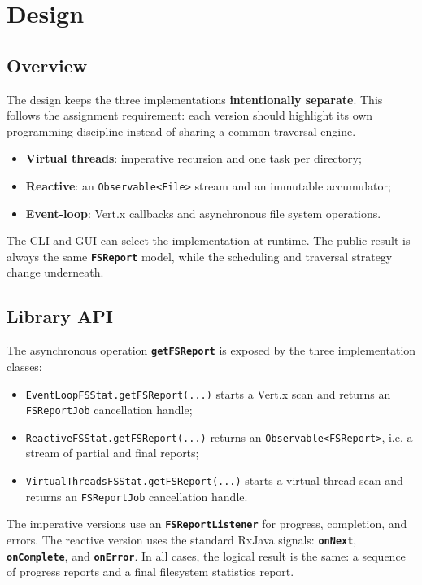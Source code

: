 \clearpage
\section{Design}

\subsection{Overview}

The design keeps the three implementations \textbf{intentionally separate}.
This follows the assignment requirement: each version should highlight its own
programming discipline instead of sharing a common traversal engine.

\begin{itemize}
  \item \textbf{Virtual threads}: imperative recursion and one task per
  directory;
  \item \textbf{Reactive}: an \texttt{Observable<File>} stream and an
  immutable accumulator;
  \item \textbf{Event-loop}: Vert.x callbacks and asynchronous file
  system operations.
\end{itemize}

The CLI and GUI can select the implementation at runtime. The public result is
always the same \textbf{\texttt{FSReport}} model, while the scheduling and
traversal strategy change underneath.

\subsection{Library API}

The asynchronous operation \textbf{\texttt{getFSReport}} is exposed by the
three implementation classes:

\begin{itemize}
  \item \texttt{EventLoopFSStat.getFSReport(...)} starts a Vert.x scan and
  returns an \texttt{FSReportJob} cancellation handle;
  \item \texttt{ReactiveFSStat.getFSReport(...)} returns an
  \texttt{Observable<FSReport>}, i.e. a stream of partial and final reports;
  \item \texttt{VirtualThreadsFSStat.getFSReport(...)} starts a virtual-thread
  scan and returns an \texttt{FSReportJob} cancellation handle.
\end{itemize}

The imperative versions use an \textbf{\texttt{FSReportListener}} for progress,
completion, and errors. The reactive version uses the standard RxJava signals:
\textbf{\texttt{onNext}}, \textbf{\texttt{onComplete}}, and
\textbf{\texttt{onError}}. In all cases, the logical result is the same: a
sequence of progress reports and a final filesystem statistics report.


